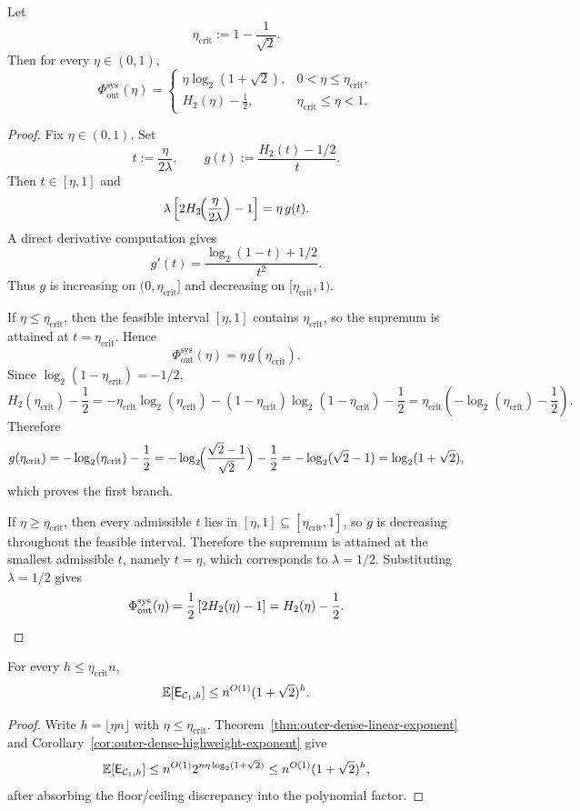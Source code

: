 \begin{corollary}
\label{cor:outer-dense-highweight-exponent}
Let
\[
\eta_{\mathrm{crit}}:=1-\frac{1}{\sqrt2}.
\]
Then for every \(\eta\in(0,1)\),
\[
\Phi_{\mathrm{out}}^{\mathrm{sys}}(\eta)
=
\begin{cases}
\eta \log_2(1+\sqrt2), & 0<\eta\le \eta_{\mathrm{crit}},\\[1ex]
H_2(\eta)-\frac12, & \eta_{\mathrm{crit}}\le \eta<1.
\end{cases}
\]
\end{corollary}

\begin{proof}
Fix \(\eta\in(0,1)\).
Set
\[
t:=\frac{\eta}{2\lambda},
\qquad
g(t):=\frac{H_2(t)-1/2}{t}.
\]
Then \(t\in[\eta,1]\) and
\[
\lambda\left[
2H_2\!\Bigl(\frac{\eta}{2\lambda}\Bigr)-1
\right]
=
\eta\,g(t).
\]
A direct derivative computation gives
\[
g'(t)
=
\frac{\log_2(1-t)+1/2}{t^2}.
\]
Thus \(g\) is increasing on \((0,\eta_{\mathrm{crit}}]\) and decreasing on \([\eta_{\mathrm{crit}},1)\).

If \(\eta\le \eta_{\mathrm{crit}}\), then the feasible interval \([\eta,1]\) contains \(\eta_{\mathrm{crit}}\), so the supremum
is attained at \(t=\eta_{\mathrm{crit}}\). Hence
\[
\Phi_{\mathrm{out}}^{\mathrm{sys}}(\eta)
=
\eta\,g(\eta_{\mathrm{crit}}).
\]
Since \(\log_2(1-\eta_{\mathrm{crit}})=-1/2\),
\[
H_2(\eta_{\mathrm{crit}})-\frac12
=
-\eta_{\mathrm{crit}}\log_2(\eta_{\mathrm{crit}})
-(1-\eta_{\mathrm{crit}})\log_2(1-\eta_{\mathrm{crit}})
-\frac12
=
\eta_{\mathrm{crit}}\!\left(-\log_2(\eta_{\mathrm{crit}})-\frac12\right).
\]
Therefore
\[
g(\eta_{\mathrm{crit}})
=
-\log_2(\eta_{\mathrm{crit}})-\frac12
=
-\log_2\!\Bigl(\frac{\sqrt2-1}{\sqrt2}\Bigr)-\frac12
=
-\log_2(\sqrt2-1)
=
\log_2(1+\sqrt2),
\]
which proves the first branch.

If \(\eta\ge \eta_{\mathrm{crit}}\), then every admissible \(t\) lies in \([\eta,1]\subseteq [\eta_{\mathrm{crit}},1]\),
so \(g\) is decreasing throughout the feasible interval.
Therefore the supremum is attained at the smallest admissible \(t\), namely \(t=\eta\), which corresponds to
\(\lambda=1/2\).
Substituting \(\lambda=1/2\) gives
\[
\Phi_{\mathrm{out}}^{\mathrm{sys}}(\eta)
=
\frac12\left[2H_2(\eta)-1\right]
=
H_2(\eta)-\frac12.
\qedhere
\]
\end{proof}

\begin{corollary}
\label{cor:outer-dense-lowlinear-envelope}
For every \(h\le \eta_{\mathrm{crit}}n\),
\[
\mathbb{E}[\mathsf{E}_{{\mathcal{C}_1},h}]
\le
n^{O(1)}(1+\sqrt2)^h.
\]
\end{corollary}

\begin{proof}
Write \(h=\lfloor \eta n\rfloor\) with \(\eta\le \eta_{\mathrm{crit}}\).
Theorem~\ref{thm:outer-dense-linear-exponent} and Corollary~\ref{cor:outer-dense-highweight-exponent} give
\[
\mathbb{E}[\mathsf{E}_{{\mathcal{C}_1},h}]
\le
n^{O(1)}2^{n\eta\log_2(1+\sqrt2)}
\le
n^{O(1)}(1+\sqrt2)^h,
\]
after absorbing the floor/ceiling discrepancy into the polynomial factor.
\end{proof}
